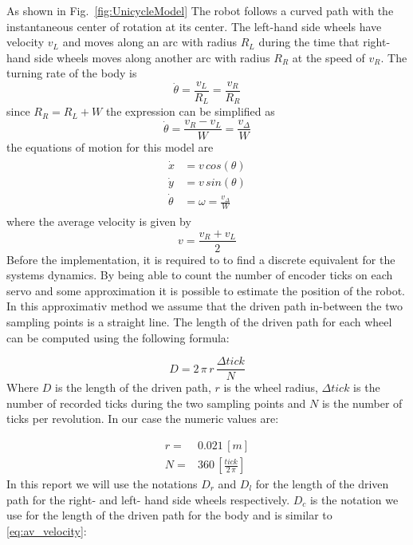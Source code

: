 As shown in Fig.~\ref{fig:UnicycleModel} The robot follows a curved path with the instantaneous center of rotation at its center.
The left-hand side wheels have velocity $v_L$ and moves along an arc with radius $R_L$ during the time that right-hand side wheels moves along another arc with radius $R_R$ at the speed of $v_R$.
The turning rate of the body is
\begin{equation*}
\dot{\theta}= \frac{v_L}{R_L} = \frac{v_R}{R_R}
\end{equation*}
since $R_R = R_L + W$ the expression can be simplified as
\begin{equation}
\dot{\theta}= \frac{v_R - v_L}{W} = \frac{v_\Delta}{W}\label{eq:ThetaDot}
\end{equation}
the equations of motion for this model are
\begin{eqnarray}
\begin{aligned}
\dot{x} &= v\,cos(\theta)\\
\dot{y} &= v\,sin(\theta)\\
\dot{\theta} &= \omega = \frac{v_\Delta}{W}
\end{aligned}
\label{eq:MotionEq}
\end{eqnarray}
where the average velocity \parencite{Corke2011} is given by
\begin{equation}
v = \frac{v_R + v_L}{2}
\label{eq:av_velocity}
\end{equation}
Before the implementation, it is required to to find a discrete equivalent for the systems dynamics.
By being able to count the number of encoder ticks on each servo and some approximation it is possible to estimate the position of the robot.
In this approximativ method we assume that the driven path in-between the two sampling points is a straight line.
The length of the driven path for each wheel can be computed using the following formula:

\begin{equation}
    D = 2\,\pi\,r\,\frac{\Delta tick}{N}
\end{equation}\label{eq:encoder-formula}
Where $D$ is the length of the driven path, $r$ is the wheel radius, $\Delta tick$ is the number of recorded ticks during the two sampling points and $N$ is the number of ticks per revolution.
In our case the numeric values are:

\begin{eqnarray*}
    r =& 0.021\, [m]\\
    N =& 360\, [\frac{tick}{2\,\pi}]
\end{eqnarray*}
In this report we will use the notations $D_r$ and $D_l$ for the length of the driven path for the right- and left- hand side wheels respectively.
$D_c$ is the notation we use for the length of the driven path for the body and is similar to \eqref{eq:av_velocity}:

